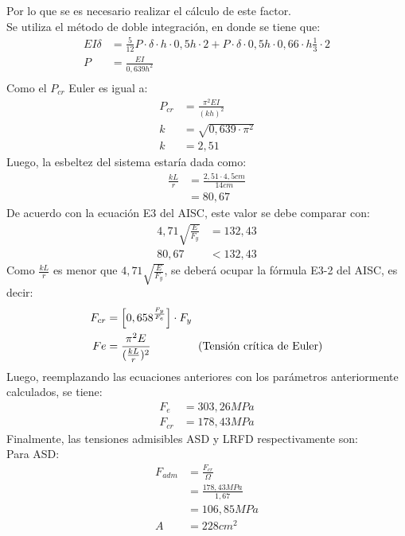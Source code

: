 \begin{example}
Por lo que se es necesario realizar el cálculo de este factor.\\
Se utiliza el método de doble integración, en donde se tiene que:\\
\begin{align*}
    EI\delta&=\frac{5}{12}P \cdot \delta \cdot h \cdot 0,5h \cdot 2+P \cdot \delta \cdot 0,5h \cdot 0,66 \cdot h \frac{1}{3} \cdot 2\\
    P&=\frac{EI}{0,639h^2}\\
\end{align*}
Como el $P_{cr}$ Euler es igual a:
\begin{align*}
    P_{cr} &= \frac{\pi^2 EI}{(kh)^2}\\
    k &= \sqrt{0,639\cdot\pi^2}\\
    k &= 2,51
\end{align*}
Luego, la esbeltez del sistema estaría dada como:
\begin{align*}
    \frac{kL}{r}&=\frac{2,51\cdot 4,5cm}{14cm}\\
    &=80,67
\end{align*}
De acuerdo con la ecuación E3 del AISC, este valor se debe comparar con:
\begin{align*}
    4,71\sqrt{\frac{E}{F_y}}&=132,43\\
    80,67&<132,43
\end{align*}
Como $\frac{kL}{r}$ es menor que $4,71\sqrt{\frac{E}{F_y}}$, se deberá ocupar la fórmula E3-2 del AISC, es decir:
\begin{align*}
    F_{cr}&=\left[0,658^\frac{F_y}{F_e}\right]\cdot F_y\\
    Fe&=\frac{\pi^2 E}{(\frac{kL}{r})^2} \text{\hspace{15mm}(Tensión crítica de Euler)}
\end{align*}
Luego, reemplazando las ecuaciones anteriores con los parámetros anteriormente calculados, se tiene:
\begin{align*}
    F_e&=303,26 MPa\\
    F_{cr}&=178,43 MPa
\end{align*}
Finalmente, las tensiones admisibles ASD y LRFD respectivamente son:\\
Para ASD:\\
 \begin{align*}
     F_{adm}&=\frac{F_{cr}}{\Omega}\\
     &=\frac{178,43 MPa}{1,67}\\
     &=106,85 MPa\\
     A&=228cm^2\\

\end{align*}
\end{example}
